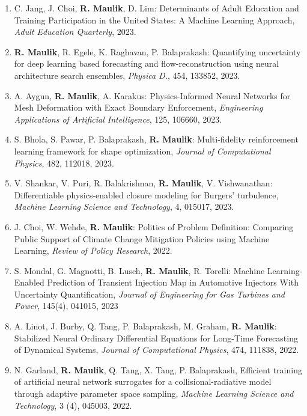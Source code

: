 \documentclass[letterpaper]{article}
\begin{document}
\begin{enumerate}
\item C. Jang, J. Choi, \textbf{R. Maulik}, D. Lim: Determinants of Adult Education and Training Participation in the United States: A Machine Learning Approach, {\it Adult Education Quarterly}, 2023.

\item \textbf{R. Maulik}, R. Egele, K. Raghavan, P. Balaprakash: Quantifying uncertainty for deep learning based forecasting and flow-reconstruction using neural architecture search ensembles, {\it Physica D.}, 454, 133852, 2023.

\item A. Aygun, \textbf{R. Maulik}, A. Karakus: Physics-Informed Neural Networks for Mesh Deformation with Exact Boundary Enforcement, {\it Engineering Applications of Artificial Intelligence}, 125, 106660, 2023.

\item S. Bhola, S. Pawar, P. Balaprakash, \textbf{R. Maulik}: Multi-fidelity reinforcement learning framework for shape optimization, {\it Journal of Computational Physics}, 482, 112018, 2023.

\item V. Shankar, V. Puri, R. Balakrishnan, \textbf{R. Maulik}, V. Vishwanathan: Differentiable physics-enabled closure modeling for Burgers' turbulence, {\it Machine Learning Science and Technology}, 4, 015017, 2023.

\item J. Choi, W. Wehde, \textbf{R. Maulik}: Politics of Problem Definition: Comparing Public Support of Climate Change Mitigation Policies using Machine Learning, {\it Review of Policy Research}, 2022.

\item S. Mondal, G. Magnotti, B. Lusch, \textbf{R. Maulik}, R. Torelli: Machine Learning-Enabled Prediction of Transient Injection Map in Automotive Injectors With Uncertainty Quantification, {\it Journal of Engineering for Gas Turbines and Power}, 145(4), 041015, 2023

\item A. Linot, J. Burby, Q. Tang, P. Balaprakash, M. Graham, \textbf{R. Maulik}: Stabilized Neural Ordinary Differential Equations for Long-Time Forecasting of Dynamical Systems, {\it Journal of Computational Physics}, 474, 111838, 2022.

\item N. Garland, \textbf{R. Maulik}, Q. Tang, X. Tang, P. Balaprakash, Efficient training of artificial neural network surrogates for a collisional-radiative model through adaptive parameter space sampling, {\it Machine Learning Science and Technology}, 3 (4), 045003, 2022.


\end{enumerate}
\end{document}
